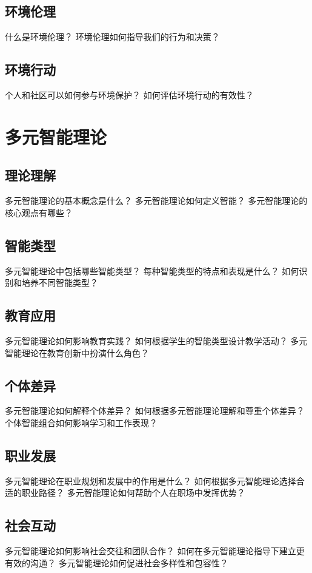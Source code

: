\documentclass[12pt]{book}
\begin{document}
\subsection{环境伦理}
什么是环境伦理？
环境伦理如何指导我们的行为和决策？

\subsection{环境行动}
个人和社区可以如何参与环境保护？
如何评估环境行动的有效性？


\section{多元智能理论}
\subsection{理论理解}
多元智能理论的基本概念是什么？
多元智能理论如何定义智能？
多元智能理论的核心观点有哪些？

\subsection{智能类型}
多元智能理论中包括哪些智能类型？
每种智能类型的特点和表现是什么？
如何识别和培养不同智能类型？

\subsection{教育应用}
多元智能理论如何影响教育实践？
如何根据学生的智能类型设计教学活动？
多元智能理论在教育创新中扮演什么角色？

\subsection{个体差异}
多元智能理论如何解释个体差异？
如何根据多元智能理论理解和尊重个体差异？
个体智能组合如何影响学习和工作表现？

\subsection{职业发展}
多元智能理论在职业规划和发展中的作用是什么？
如何根据多元智能理论选择合适的职业路径？
多元智能理论如何帮助个人在职场中发挥优势？

\subsection{社会互动}
多元智能理论如何影响社会交往和团队合作？
如何在多元智能理论指导下建立更有效的沟通？
多元智能理论如何促进社会多样性和包容性？
\end{document}
